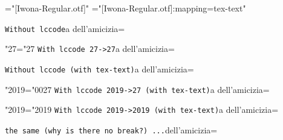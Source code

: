 \font\fontA="[Iwona-Regular.otf]"
\font\fontB="[Iwona-Regular.otf]:mapping=tex-text"


\newdimen\savehsize
\savehsize\hsize

\def\test#1#2{{\tt#1}\endgraf\hsize=3pt\noindent #2\endgraf\hsize=\savehsize}

\def\testA#1{\test{#1}{a dell'amicizia}}
\def\testB#1{\test{#1}{dell'amicizia}}

\fontA

\testA{Without lccode}

\bgroup
\lccode"27="27
\testA{With lccode 27->27}
\egroup


\fontB

\testA{Without lccode (with tex-text)}

\bgroup
\lccode"2019="0027
\testA{With lccode 2019->27 (with tex-text)}
\egroup

\bgroup
\lccode"2019="2019
\testA{With lccode 2019->2019 (with tex-text)}

\testB{the same (why is there no break?) ...}
\egroup

\bye
